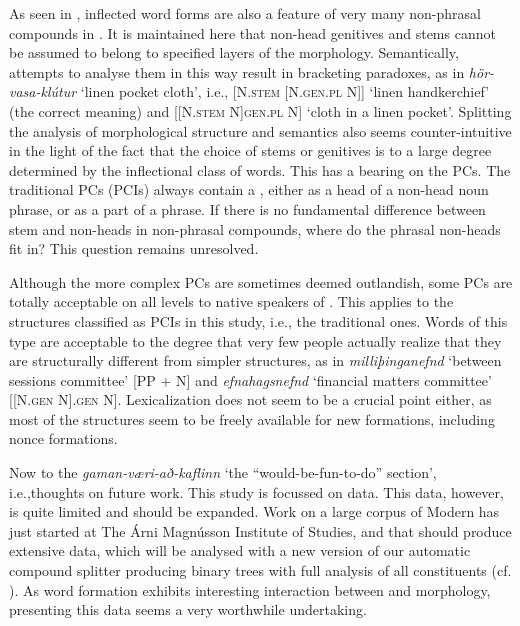 \documentclass[output=paper]{LSP/langsci}
\begin{document}
\begin{xlist}
As seen in , inflected word forms are also a feature of very many non-phrasal compounds in .  It is maintained here that non-head genitives and stems cannot be assumed to belong to specified layers of the morphology. Semantically, attempts to analyse them in this way result in bracketing paradoxes, as in \textit{hör-vasa-klútur} ‘linen pocket cloth’, i.e., [N\textsc{.stem} [N\textsc{.gen.pl} N]] ‘linen handkerchief’ (the correct meaning) and [[N\textsc{.stem} N]\textsc{gen.pl} N] ‘cloth in a linen pocket’. Splitting the analysis of morphological structure and semantics also seems counter-intuitive in the light of the fact that the choice of stems or genitives is to a large degree determined by the inflectional class of words. This has a bearing on the PCs. The traditional PCs (PCIs) always contain a , either as a head of a non-head noun phrase, or as a part of a  phrase. If there is no fundamental difference between stem and  non-heads in non-phrasal compounds, where do the  phrasal non-heads fit in? This question remains unresolved. 

Although the more complex PCs are sometimes deemed outlandish, some PCs are totally acceptable on all levels to native speakers of . This applies to the structures classified as PCIs in this study, i.e., the traditional ones. Words of this type are acceptable to the degree that very few people actually realize that they are structurally different from simpler structures, as in \textit{milliþinganefnd} ‘between sessions committee’ [PP + N] and \textit{efnahagsnefnd} ‘financial matters committee’ [[N\textsc{.gen} N]\textsc{.gen} N]. Lexicalization does not seem to be a crucial point either, as most of the structures seem to be freely available for new formations, including nonce formations.

Now to the \textit{gaman-væri-að-kaflinn} ‘the “would-be-fun-to-do” section’, i.e.,\linebreak thoughts on future work. This study is focussed on data. This data, however, is quite limited and should be expanded. Work on a large corpus of Modern  has just started at The Árni Magnússon Institute of  Studies, and that should produce extensive data, which will be analysed with a new version of our automatic compound splitter producing binary trees with full analysis of all constituents (cf. \citealt{DaðasonEtAl2014}). As  word formation exhibits interesting interaction between  and morphology, presenting this data seems a very worthwhile undertaking.


\end{xlist}
\end{document}
